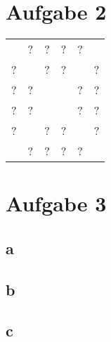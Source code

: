 \documentclass[10pt,a4paper]{article}
\begin{document}
\section{Aufgabe 2}
 \begin{tabular}{cccccc}
  \cellcolor{red} & ? & ? & ? & ? & \cellcolor{black}\\
  ? & \cellcolor{red} & ? & ? & \cellcolor{black} & ?\\
  ? & ? & \cellcolor{red} & \cellcolor{black} & ? & ?\\
  ? & ? & \cellcolor{black} & \cellcolor{red} & ? & ?\\
  ? & \cellcolor{black} & ? & ? & \cellcolor{red} & ?\\
  \cellcolor{black} & ? & ? & ? & ? & \cellcolor{red}\\
 \end{tabular}

\section{Aufgabe 3}
\subsection*{a}
\subsection*{b}
\subsection*{c}
\end{document}
